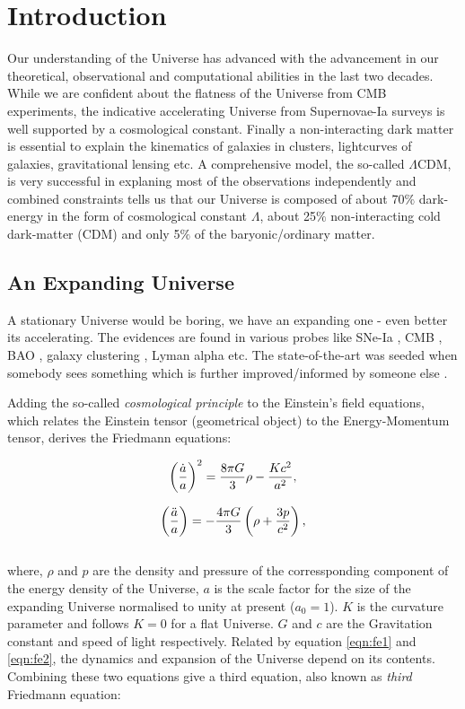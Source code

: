 \chapter{Introduction}\label{Introduction}

Our understanding of the Universe has advanced with the advancement in our 
theoretical, observational and computational abilities in the last two decades. 
While we are confident about the flatness of the Universe from CMB experiments, 
the indicative accelerating Universe from Supernovae-Ia surveys is well supported
by a cosmological constant. Finally a non-interacting dark matter is essential 
to explain the kinematics of galaxies in clusters, lightcurves of galaxies, 
gravitational lensing etc. A comprehensive model, the so-called $\Lambda$CDM,
is very successful in explaning most of the observations independently and 
combined constraints tells us that our Universe is composed of about 70$\%$
dark-energy in the form of cosmological constant $\Lambda$, about 25$\%$ non-interacting
cold dark-matter (CDM) and only 5$\%$ of the baryonic/ordinary matter. 




\section{An Expanding Universe}

A stationary Universe would be boring, we have an expanding one - even better its
accelerating. The evidences are found in various probes like SNe-Ia \cite{}, 
CMB \cite{}, BAO \cite{}, galaxy clustering \cite{}, Lyman alpha \cite{} etc. 
The state-of-the-art was seeded when somebody sees something \cite{} which is 
further improved/informed by someone else \cite{}. 

Adding the so-called {\it cosmological principle} to the Einstein's field equations, 
which relates the Einstein tensor (geometrical object) to the Energy-Momentum tensor, 
derives the Friedmann equations:

\begin{equation}
\centering
\left( \dfrac{\dot{a}}{a} \right)^2 = \dfrac{8 \pi G}{3} \rho - \dfrac{Kc^2}{a^2},
\label{eqn:fe1}
\end{equation}

\begin{equation}
\centering
\left( \dfrac{\ddot{a}}{a} \right) = -\dfrac{4 \pi G}{3} \left( \rho + \dfrac{3p}{c^2} \right),
\label{eqn:fe2}
\end{equation}
\\
where, $\rho$ and $p$ are the density and pressure of the corressponding component of
the energy density of the Universe, $a$ is the scale factor for the size of the expanding
Universe normalised to unity at present ($a_0=1$).
$K$ is the curvature parameter and follows $K=0$ for a flat Universe. $G$ and $c$ are
the Gravitation constant and speed of light respectively. Related by equation \ref{eqn:fe1} 
and \ref{eqn:fe2}, the dynamics and expansion of the Universe depend on its contents. 
Combining these two equations give a third equation, also known as {\it third} Friedmann
equation:

